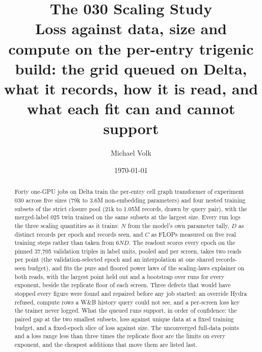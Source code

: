 \documentclass[10pt,a4paper]{article}
\title{\vspace{-1.5em}The 030 Scaling Study\\
  {\large Loss against data, size and compute on the per-entry trigenic build:
   the grid queued on Delta, what it records, how it is read, and what each fit
   can and cannot support}}
\author{Michael Volk}
\date{\today}
\begin{document}
\maketitle
\thispagestyle{empty}

\begin{abstract}
\noindent
Forty one-GPU jobs on Delta train the per-entry cell graph transformer of
experiment 030 across five sizes (79k to 3.6M non-embedding parameters) and four
nested training subsets of the strict closure pool (21k to 1.05M records, drawn by
query pair), with the merged-label 025 twin trained on the same subsets at the
largest size. Every run logs the three scaling quantities as it trains: $N$ from
the model's own parameter tally, $D$ as distinct records per epoch and records
seen, and $C$ as FLOPs measured on five real training steps rather than taken
from $6ND$. The readout scores every epoch on the pinned 37,705 validation
triples in label units, pooled and per screen, takes two reads per point (the
validation-selected epoch and an interpolation at one shared records-seen
budget), and fits the pure and floored power laws of the scaling-laws explainer on
both reads, with the largest point held out and a bootstrap over runs for every
exponent, beside the replicate floor of each screen. Three defects that would have
stopped every figure were found and repaired before any job started: an override
Hydra refused, compute rows a W\&B history query could not see, and a per-screen
loss key the trainer never logged. What the queued runs support, in order of
confidence: the paired gap at the two smallest subsets, loss against unique data
at a fixed training budget, and a fixed-epoch slice of loss against size. The
unconverged full-data points and a loss range less than three times the
replicate floor are the limits on every exponent, and the cheapest additions that
move them are listed last.
\end{abstract}

\vspace{0.5em}
\tccontents
\clearpage







\end{document}

